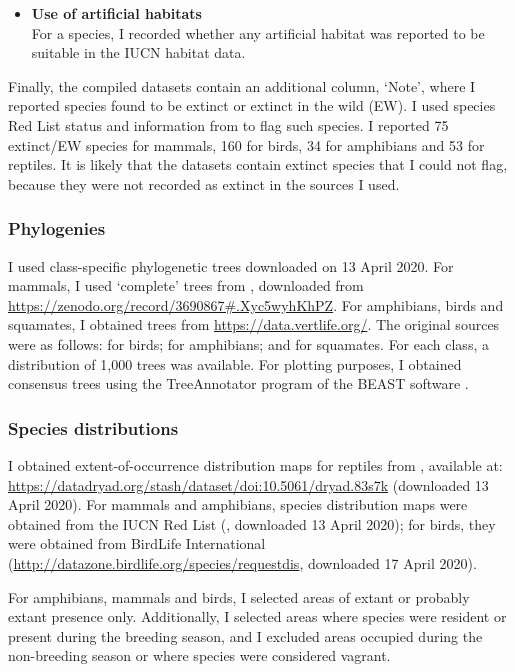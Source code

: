 \begin{itemize}
\item \textbf{Use of artificial habitats}\\
For a species, I recorded whether any artificial habitat was reported to be suitable in the IUCN habitat data.
\end{itemize}

Finally, the compiled datasets contain an additional column, `Note', where I reported species found to be extinct or extinct in the wild (EW). I used species Red List status and information from \citet{Meiri2018GEB} to flag such species. I reported 75 extinct/EW species for mammals, 160 for birds, 34 for amphibians and 53 for reptiles. It is likely that the datasets contain extinct species that I could not flag, because they were not recorded as extinct in the sources I used.

\newpage
\subsubsection{Phylogenies}
I used class-specific phylogenetic trees downloaded on 13 April 2020. For mammals, I used `complete' trees from \citet{Faurby2018, Faurby2020}, downloaded from \url{https://zenodo.org/record/3690867#.Xyc5wyhKhPZ}. For amphibians, birds and squamates, I obtained trees from \url{https://data.vertlife.org/}. The original sources were as follows: \citet{Jetz2012} for birds; \citet{Jetz2018} for amphibians; and \citet{Tonini2016} for squamates. For each class, a distribution of 1,000 trees was available. For plotting purposes, I obtained consensus trees using the TreeAnnotator program of the BEAST software \citep{Bouckaert2019}.

\subsubsection{Species distributions}
I obtained extent-of-occurrence distribution maps for reptiles from \citet{Roll2017}, available at: \url{https://datadryad.org/stash/dataset/doi:10.5061/dryad.83s7k} (downloaded 13 April 2020). For mammals and amphibians, species distribution maps were obtained from the IUCN Red List (\citet{IUCN2020}, downloaded 13 April 2020); for birds, they were obtained from BirdLife International (\url{http://datazone.birdlife.org/species/requestdis}, downloaded 17 April 2020).

For amphibians, mammals and birds, I selected areas of extant or probably extant presence only. Additionally, I selected areas where species were resident or present during the breeding season, and I excluded areas occupied during the non-breeding season or where species were considered vagrant.

